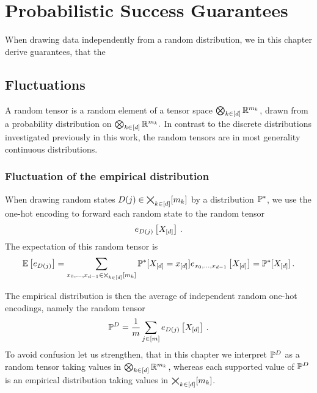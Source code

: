 \section{Probabilistic Success Guarantees}\label{cha:mlnConcentration}

When drawing data independently from a random distribution, we in this chapter derive guarantees, that the 

%
	
	
\subsection{Fluctuations}

A random tensor is a random element of a tensor space $\bigotimes_{k\in[d]} \mathbb{R}^{m_{k}}$, drawn from a probability distribution on $\bigotimes_{k\in[d]} \mathbb{R}^{m_{k}}.$
In contrast to the discrete distributions investigated previously in this work, the random tensors are in most generality continuous distributions. %

\subsubsection{Fluctuation of the empirical distribution}

When drawing random states $D(j)\in\bigtimes_{k\in[d]}[m_{k}]$ by a distribution $\mathbb{P}^*$, we use the one-hot encoding to forward each random state to the random tensor
	\[ e_{D(j)}\left[X_{[d]}\right] \, . \]
The expectation of this random tensor is
\begin{align*}
	\mathbb{E}\left[e_{D(j)}\right] 
	= \sum_{x_{0},\ldots,x_{d-1}\in\bigtimes_{k\in[d]}[m_{k}]} \mathbb{P}^*[X_{[d]}=x_{[d]}] e_{x_{0},\ldots,x_{d-1}}\left[X_{[d]}\right] 
	= \mathbb{P}^*[X_{[d]}] \, . 
\end{align*}
	
The empirical distribution is then the average of independent random one-hot encodings, namely the random tensor
	\[ \mathbb{P}^{D} = \frac{1}{m} \sum_{j\in[m]}  e_{D(j)}\left[X_{[d]}\right] \, . \]
To avoid confusion let us strengthen, that in this chapter we interpret $\mathbb{P}^{D}$ as a random tensor taking values in $\bigotimes_{k\in[d]} \mathbb{R}^{m_{k}}$, whereas each supported value of $\mathbb{P}^{D}$ is an empirical distribution taking values in $\bigtimes_{k\in[d]}[m_{k}]$.


